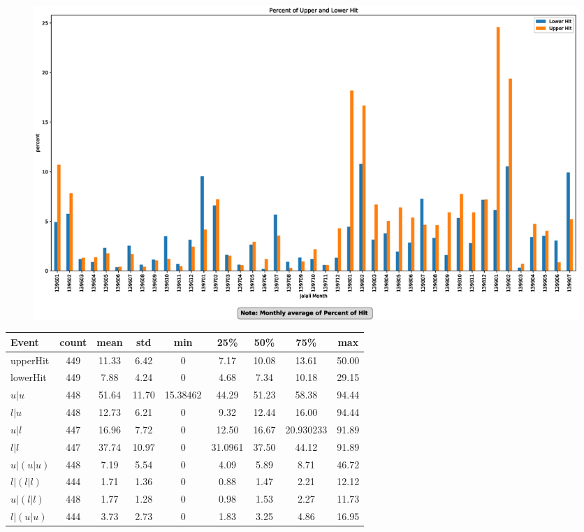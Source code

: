 \documentclass[12pt]{article}
\begin{document}
\begin{landscape}
\begin{figure}
\centering
\includegraphics[width=1\linewidth ]{MNH2.eps}
\caption{}
\label{fig:mnh2}
\end{figure}
\end{landscape}



{\begin{table}[htbp]
  \centering
    \begin{tabular}{|l|c|cc|ccccc|}
    \hline
    Event & {count} & {mean} &{std} &{min} & 25\%  & 50\%  & 75\%  & {max} \\
    \hline
        upperHit & 449   & 11.33 & 6.42  & 0     & 7.17  & 10.08 & 13.61 & 50.00 \\
        lowerHit & 449   & 7.88  & 4.24  & 0     & 4.68  & 7.34  & 10.18 & 29.15 \\
        $ u|u $   & 448   & 51.64 & 11.70 & 15.38462 & 44.29 & 51.23 & 58.38 & 94.44 \\
        $ l|u $   & 448   & 12.73 & 6.21  & 0     & 9.32  & 12.44 & 16.00 & 94.44 \\
        $ u|l $   & 447   & 16.96 & 7.72  & 0     & 12.50 & 16.67 & 20.930233 & 91.89 \\
        $ l|l $   & 447   & 37.74 & 10.97 & 0     & 31.0961 & 37.50 & 44.12 & 91.89 \\
        $ u|(u|u) $ & 448   & 7.19  & 5.54  & 0     & 4.09  & 5.89  & 8.71  & 46.72 \\
        $ l|(l|l) $ & 444   & 1.71  & 1.36  & 0     & 0.88  & 1.47  & 2.21  & 12.12 \\
        $ u|(l|l) $ & 448   & 1.77  & 1.28  & 0     & 0.98  & 1.53  & 2.27  & 11.73 \\
        $ l|(u|u) $ & 444   & 3.73  & 2.73  & 0     & 1.83  & 3.25  & 4.86  & 16.95 \\
         \hline
    \end{tabular}
\end{table}}
\end{document}
